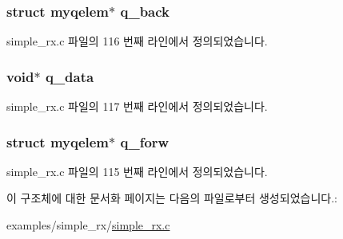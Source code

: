 \subsubsection[{\texorpdfstring{q\+\_\+back}{q_back}}]{\setlength{\rightskip}{0pt plus 5cm}struct {\bf myqelem}$\ast$ q\+\_\+back}\hypertarget{structmyqelem_a5f8edc46d06b598c73d0f9a21337ce67}{}\label{structmyqelem_a5f8edc46d06b598c73d0f9a21337ce67}


simple\+\_\+rx.\+c 파일의 116 번째 라인에서 정의되었습니다.

\subsubsection[{\texorpdfstring{q\+\_\+data}{q_data}}]{\setlength{\rightskip}{0pt plus 5cm}void$\ast$ q\+\_\+data}\hypertarget{structmyqelem_acb8f87bdd4c71e7f394698031ea1d365}{}\label{structmyqelem_acb8f87bdd4c71e7f394698031ea1d365}


simple\+\_\+rx.\+c 파일의 117 번째 라인에서 정의되었습니다.

\subsubsection[{\texorpdfstring{q\+\_\+forw}{q_forw}}]{\setlength{\rightskip}{0pt plus 5cm}struct {\bf myqelem}$\ast$ q\+\_\+forw}\hypertarget{structmyqelem_a0d26e2f3a0ea8cd77d99a2f2e6524d3b}{}\label{structmyqelem_a0d26e2f3a0ea8cd77d99a2f2e6524d3b}


simple\+\_\+rx.\+c 파일의 115 번째 라인에서 정의되었습니다.



이 구조체에 대한 문서화 페이지는 다음의 파일로부터 생성되었습니다.\+:\begin{DoxyCompactItemize}
\item 
examples/simple\+\_\+rx/\hyperlink{simple__rx_8c}{simple\+\_\+rx.\+c}\end{DoxyCompactItemize}

